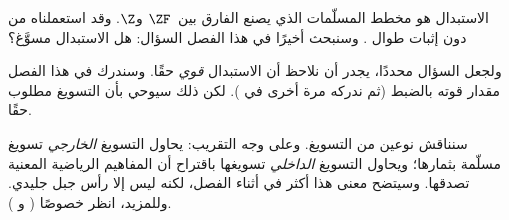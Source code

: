 \documentclass[../../../include/open-logic-section]{subfiles}
\begin{document}

الاستبدال هو مخطط المسلّمات الذي يصنع الفارق بين~$\ZF$ و$\Z$. وقد
استعملناه من دون إثبات طوال
. وسنبحث أخيرًا في هذا
الفصل السؤال: هل الاستبدال مسوَّغ؟

ولجعل السؤال محددًا، يجدر أن نلاحظ أن الاستبدال \emph{قوي} حقًا.
وسندرك في هذا الفصل مقدار قوته بالضبط (ثم ندركه مرة أخرى في
). لكن ذلك سيوحي بأن التسويغ
مطلوب حقًا.

سنناقش نوعين من التسويغ. وعلى وجه التقريب: يحاول التسويغ
\emph{الخارجي} تسويغ مسلّمة بثمارها؛ ويحاول التسويغ \emph{الداخلي}
تسويغها باقتراح أن المفاهيم الرياضية المعنية تصدقها. وسيتضح معنى هذا
أكثر في أثناء الفصل، لكنه ليس إلا رأس جبل جليدي. وللمزيد، انظر خصوصًا
\citeauthor{Maddy1988a} (\citeyear{Maddy1988a} و
\citeyear{Maddy1988b}).
\end{document}
